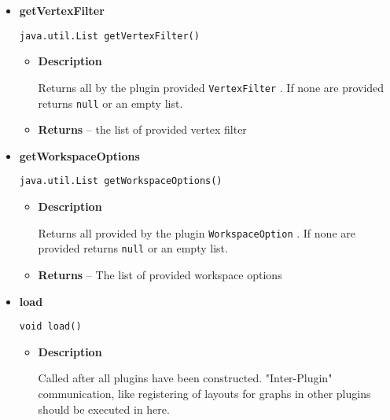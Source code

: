 {{{{{{{{{{\begin{itemize}
{\begin{itemize}
{Returns the name of the plugin. Uniqueness can't be assumed.
}
\item{{\bf  Returns} -- 
the name of the plugin 
}%
\end{itemize}
}%
\item{ 
{\bf  getVertexFilter}\\
\begin{lstlisting}[frame=none]
java.util.List getVertexFilter()\end{lstlisting} %
\begin{itemize}
\item{
{\bf  Description}

Returns all by the plugin provided \texttt{\small VertexFilter}{\small 
{}}. If none are provided returns \texttt{\small null} or an empty list.
}
\item{{\bf  Returns} -- 
the list of provided vertex filter 
}%
\end{itemize}
}%
\item{ 
{\bf  getWorkspaceOptions}\\
\begin{lstlisting}[frame=none]
java.util.List getWorkspaceOptions()\end{lstlisting} %
\begin{itemize}
\item{
{\bf  Description}

Returns all provided by the plugin \texttt{\small WorkspaceOption}{\small 
{}}. If none are provided returns \texttt{\small null} or an empty list.
}
\item{{\bf  Returns} -- 
The list of provided workspace options 
}%
\end{itemize}
}%
\item{ 
{\bf  load}\\
\begin{lstlisting}[frame=none]
void load()\end{lstlisting} %
\begin{itemize}
\item{
{\bf  Description}

Called after all plugins have been constructed. "Inter-Plugin" communication, like registering of layouts for graphs in other plugins should be executed in here.
}
\end{itemize}
}%
\end{itemize}
}
}
}}}}}}}}
